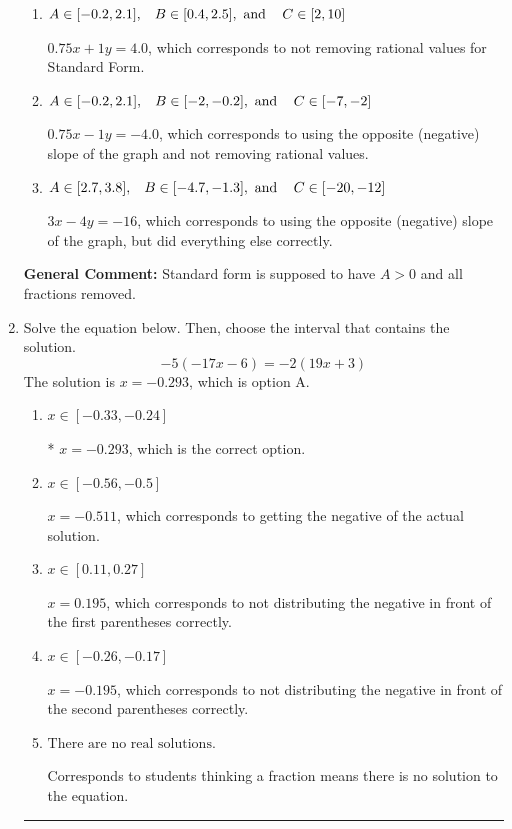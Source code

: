 \documentclass{extbook}[14pt]
\newcommand{\litem}[1]{\item #1

\rule{\textwidth}{0.4pt}}
\begin{document}
\begin{enumerate}
{\begin{enumerate}[label=\Alph*.]
* $3x + 4y = 16$, which is the correct option.
\item \( A \in [-0.2, 2.1], \hspace{3mm} B \in [0.4, 2.5], \text{ and } \hspace{3mm} C \in [2, 10] \)

 $0.75x + 1y = 4.0$, which corresponds to not removing rational values for Standard Form.
\item \( A \in [-0.2, 2.1], \hspace{3mm} B \in [-2, -0.2], \text{ and } \hspace{3mm} C \in [-7, -2] \)

 $0.75x - 1y = -4.0$, which corresponds to using the opposite (negative) slope of the graph and not removing rational values.
\item \( A \in [2.7, 3.8], \hspace{3mm} B \in [-4.7, -1.3], \text{ and } \hspace{3mm} C \in [-20, -12] \)

 $3x - 4y = -16$, which corresponds to using the opposite (negative) slope of the graph, but did everything else correctly.
\end{enumerate}

\textbf{General Comment:} Standard form is supposed to have $A > 0$ and all fractions removed.
}
\litem{
Solve the equation below. Then, choose the interval that contains the solution.
\[ -5(-17x -6) = -2(19x + 3) \]The solution is \( x = -0.293 \), which is option A.\begin{enumerate}[label=\Alph*.]
\item \( x \in [-0.33, -0.24] \)

* $x = -0.293$, which is the correct option.
\item \( x \in [-0.56, -0.5] \)

$x = -0.511$, which corresponds to getting the negative of the actual solution.
\item \( x \in [0.11, 0.27] \)

$x = 0.195$, which corresponds to not distributing the negative in front of the first parentheses correctly.
\item \( x \in [-0.26, -0.17] \)

$x = -0.195$, which corresponds to not distributing the negative in front of the second parentheses correctly.
\item \( \text{There are no real solutions.} \)

Corresponds to students thinking a fraction means there is no solution to the equation.
\end{enumerate}

}
\end{enumerate}
\end{document}
